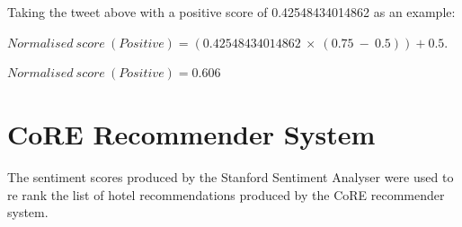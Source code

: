 Taking the tweet above with a positive score of 0.42548434014862 as an example:
\begin{tcolorbox}
$Normalised\ score\ (Positive) = (0.42548434014862\ \times\ (0.75\ -\ 0.5)) + 0.5.$

$Normalised\ score\ (Positive) = 0.606$
\end{tcolorbox}

\section{CoRE Recommender System}

The sentiment scores produced by the Stanford Sentiment Analyser were used to re rank the list of hotel recommendations produced by the CoRE recommender system.

